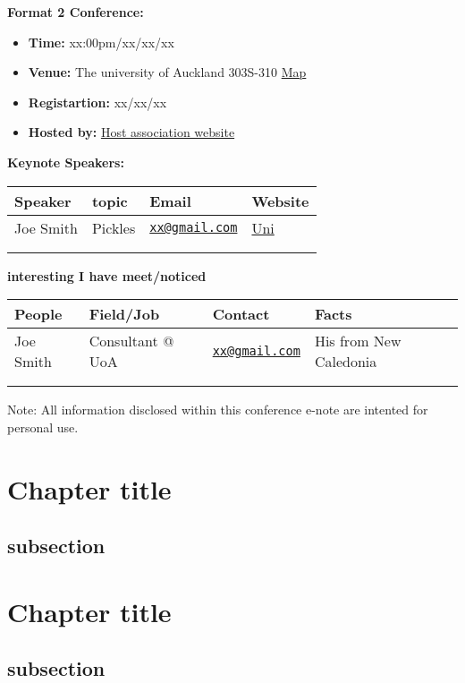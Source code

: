 \documentclass[
]{book}
\providecommand{\tightlist}{%
  \setlength{\itemsep}{0pt}\setlength{\parskip}{0pt}}
\begin{document}
\textbf{Format 2 Conference:}

\begin{itemize}
\tightlist
\item
  \textbf{Time:} xx:00pm/xx/xx/xx
\item
  \textbf{Venue:} The university of Auckland 303S-310 \href{}{Map}
\item
  \textbf{Registartion:} xx/xx/xx\\
\item
  \textbf{Hosted by:} \href{}{Host association website}
\end{itemize}

\textbf{Keynote Speakers:}

\begin{longtable}[]{@{}llll@{}}
\toprule
Speaker & topic & Email & Website\tabularnewline
\midrule
\endhead
Joe Smith & Pickles & \href{mailto:xx@gmail.com}{\nolinkurl{xx@gmail.com}} & \href{www.google.com}{Uni}\tabularnewline
& & &\tabularnewline
& & &\tabularnewline
\bottomrule
\end{longtable}

\textbf{interesting I have meet/noticed}

\begin{longtable}[]{@{}llll@{}}
\toprule
People & Field/Job & Contact & Facts\tabularnewline
\midrule
\endhead
Joe Smith & Consultant @ UoA & \href{mailto:xx@gmail.com}{\nolinkurl{xx@gmail.com}} & His from New Caledonia\tabularnewline
& & &\tabularnewline
& & &\tabularnewline
\bottomrule
\end{longtable}

Note: All information disclosed within this conference e-note are intented for personal use.

\hypertarget{ch2}{%
\chapter{Chapter title}\label{ch2}}

\hypertarget{subsection}{%
\section{subsection}\label{subsection}}

\hypertarget{ch3}{%
\chapter{Chapter title}\label{ch3}}

\hypertarget{subsection}{%
\section{subsection}\label{subsection}}
\end{document}
